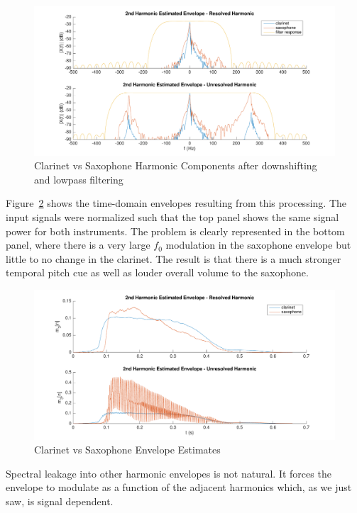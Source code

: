 \documentclass [11pt, proquest,oneside] {ganter_thesis}[2015/03/03]
\begin{document}
\begin{figure}[!ht]
  \centering
    \includegraphics[width=1\textwidth]{matlab/clarinetVSsax_F}
    \caption{Clarinet vs Saxophone Harmonic Components after downshifting and lowpass filtering}\label{fig:clarinetVSsax_F}
\end{figure}

Figure~\ref{fig:clarinetVSsax_T} shows the time-domain envelopes resulting from this processing.  The input signals were normalized such that the top panel shows the same signal power for both instruments.  The problem is clearly represented in the bottom panel, where there is a very large $f_0$ modulation in the saxophone envelope but little to no change in the clarinet.  The result is that there is a much stronger temporal pitch cue as well as louder overall volume to the saxophone.

\begin{figure}[!ht]
  \centering
    \includegraphics[width=1\textwidth]{matlab/clarinetVSsax_T}   
    \caption{Clarinet vs Saxophone Envelope Estimates}\label{fig:clarinetVSsax_T}
\end{figure}

Spectral leakage into other harmonic envelopes is not natural.  It forces the envelope to modulate as a function of the adjacent harmonics which, as we just saw, is signal dependent.
\end{document}
